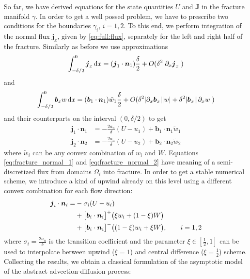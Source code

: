 \documentclass[a4paper]{article}
\def\prtl{\partial}
\def\vc#1{\mathbf{\boldsymbol{#1}}}     %
\def\abs#1{\lvert#1\rvert}
\def\d {\,{\rm d}}
\begin{document}
So far, we have derived equations for the state quantities $U$ and $\vc J$ in the fracture manifold $\gamma$. In order to
get a well possed problem, we have to prescribe two conditions for the boundaries $\gamma_i$, $i=1,2$. To this end, we
perform integration of the normal flux $\vc j_x$, given by \eqref{eq:full:flux}, separately for the left and right half of the fracture.
Similarly as before we use approximations
\[
 \int_{-\delta/2}^0 \vc j_x \d x = (\vc j_1 \cdot \vc n_1)\frac{\delta}{2} + O(\delta^2 \abs{\prtl_x \vc j_x})
\]
and 
\[
 \int_{-\delta/2}^0 \vc b_x w \d x = (\vc b_1 \cdot \vc n_1)\tilde{w}_1\frac{\delta}{2} + O(\delta^2 \abs{\prtl_x \vc b_x}\abs{w} + \delta^2\abs{\vc b_x}\abs{\prtl_x w})
\]
and their counterparts on the interval $(0,\delta/2)$ to get
\begin{align}
    \label{eq:fracture_normal_1}
     \vc j_1 \cdot \vc n_1 &= -\frac{2a_n}{\delta} (U - u_1) + \vc b_1\cdot \vc n_1 \tilde{w}_1\\
    \label{eq:fracture_normal_2}
    \vc j_2 \cdot \vc n_2 &= -\frac{2a_n}{\delta} (U - u_2) + \vc b_2\cdot \vc n_2 \tilde{w}_2
\end{align}
where $\tilde w_i$ can be any convex combination of $w_i$ and $W$. Equations \eqref{eq:fracture_normal_1}  
and \eqref{eq:fracture_normal_2} have meaning of a semi-discretized flux from domains $\Omega_i$ into fracture.
In order to get a stable numerical scheme, we introduce a kind of upwind already on this level using a different convex 
combination for each flow direction:
\begin{align}
   \notag 
   \vc j_i \cdot \vc n_i
       = &-\sigma_i (U - u_i)      \\ 
   \notag
      &+ \big[\vc b_i\cdot \vc n_i\big]^{+} \big(\xi w_i + (1-\xi) W\big)       \\
      \label{eq:fracture_normal}
      &+ \big[\vc b_i\cdot \vc n_i\big]^{-} \big((1-\xi) w_i + \xi W\big), \qquad i=1,2
\end{align}
where $\sigma_i = \frac{2a_n}{\delta}$ is the transition coefficient and the parameter $\xi\in [\frac12, 1]$ can be used to interpolate
between upwind ($\xi = 1$) and central difference ($\xi=\frac12$) scheme. Collecting the results, we obtain a classical formulation of 
the asymptotic model of the abstract advection-diffusion process:
\end{document}
